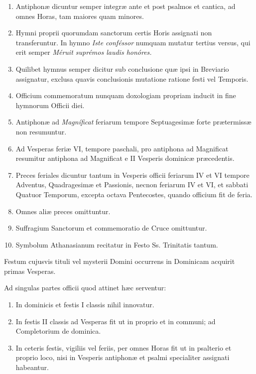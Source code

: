 \documentclass[vesperale_romanum.tex]{subfiles}
\begin{document}
\begin{enumerate}[nosep]
\item Antiphonæ dicuntur semper integræ ante et post psalmos et cantica, ad omnes Horas, tam maiores quam minores.
\item Hymni proprii quorumdam sanctorum certis Horis assignati non transferuntur. In hymno \textit{Iste conféssor} numquam mutatur tertius versus, qui erit semper \textit{Méruit suprémos laudis honóres.}
\item Quilibet hymnus semper dicitur sub conclusione quæ ipsi in Breviario assignatur, exclusa quavis conclusionis mutatione ratione festi vel Temporis.
\item Officium commemoratum nunquam doxologiam propriam inducit in fine hymnorum Officii diei.
\item Antiphonæ ad \textit{Magníficat} feriarum tempore Septuagesimæ forte prætermissæ non resumuntur.
\item Ad Vesperas feriæ VI, tempore paschali, pro antiphona ad Magnificat resumitur antiphona ad Magnificat e II Vesperis dominicæ præcedentis.
\item Preces feriales dicuntur tantum in Vesperis officii feriarum IV et VI tempore Adventus, Quadragesimæ et Passionis, necnon feriarum IV et VI, et sabbati Quatuor Temporum, excepta octava Pentecostes, quando officium fit de feria.
\item Omnes aliæ preces omittuntur.
 \item Suffragium Sanctorum et commemoratio de Cruce omittuntur.
\item Symbolum Athanasianum recitatur in Festo Ss. Trinitatis tantum.
\end{enumerate}


Festum cujusvis tituli vel mysterii Domini occurrens in Dominicam acquirit primas Vesperas.

Ad singulas partes officii quod attinet hæc serventur:
\begin{enumerate}[nosep,label=\alph*.]
\item In dominicis et festis I classis nihil innovatur.
\item In festis II classis ad Vesperas fit ut in proprio et in communi; ad Completorium de dominica.
\item In ceteris festis, vigiliis vel feriis, per omnes Horas fit ut in psalterio et proprio loco, nisi in Vesperis antiphonæ et psalmi specialiter assignati habeantur.
\end{enumerate}
\end{document}

